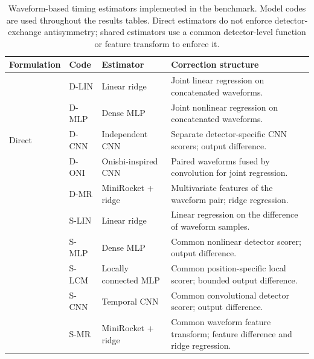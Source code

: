 \begin{table}[t]
\centering
\small
\begin{tabular}{@{}p{}p{}p{}p{}@{}}
\toprule
Formulation & Code & Estimator & Correction structure \\
\midrule
\multirow{5}{*}{Direct}
& D-LIN & Linear ridge & Joint linear regression on concatenated waveforms. \\
& D-MLP & Dense MLP & Joint nonlinear regression on concatenated waveforms. \\
& D-CNN & Independent CNN & Separate detector-specific CNN scorers; output difference. \\
& D-ONI & Onishi-inspired CNN & Paired waveforms fused by convolution for joint regression. \\
& D-MR & MiniRocket + ridge & Multivariate features of the waveform pair; ridge regression. \\
\addlinespace[4pt]
\midrule
\addlinespace[4pt]
\multirow{5}{*}{Shared}
& S-LIN & Linear ridge & Linear regression on the difference of waveform samples. \\
& S-MLP & Dense MLP & Common nonlinear detector scorer; output difference. \\
& S-LCM & Locally connected MLP & Common position-specific local scorer; bounded output difference. \\
& S-CNN & Temporal CNN & Common convolutional detector scorer; output difference. \\
& S-MR & MiniRocket + ridge & Common waveform feature transform; feature difference and ridge regression. \\
\bottomrule
\end{tabular}
\caption{Waveform-based timing estimators implemented in the benchmark. Model
codes are used throughout the results tables. Direct estimators do not enforce
detector-exchange antisymmetry; shared estimators use a common detector-level
function or feature transform to enforce it.}
\label{tab:model-inventory}
\end{table}